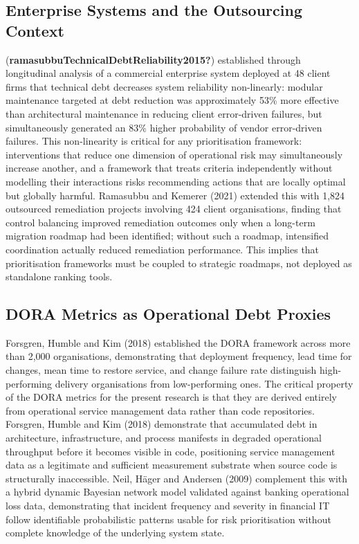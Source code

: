 \documentclass[
  british,
  12pt,
  a4paper,
]{report}
\begin{document}
\subsection{Enterprise Systems and the Outsourcing
Context}\label{enterprise-systems-and-the-outsourcing-context}

(\textbf{ramasubbuTechnicalDebtReliability2015?}) established through
longitudinal analysis of a commercial enterprise system deployed at 48
client firms that technical debt decreases system reliability
non-linearly: modular maintenance targeted at debt reduction was
approximately 53\% more effective than architectural maintenance in
reducing client error-driven failures, but simultaneously generated an
83\% higher probability of vendor error-driven failures. This
non-linearity is critical for any prioritisation framework:
interventions that reduce one dimension of operational risk may
simultaneously increase another, and a framework that treats criteria
independently without modelling their interactions risks recommending
actions that are locally optimal but globally harmful. Ramasubbu and
Kemerer (2021) extended this with 1,824 outsourced remediation projects
involving 424 client organisations, finding that control balancing
improved remediation outcomes only when a long-term migration roadmap
had been identified; without such a roadmap, intensified coordination
actually reduced remediation performance. This implies that
prioritisation frameworks must be coupled to strategic roadmaps, not
deployed as standalone ranking tools.

\subsection{DORA Metrics as Operational Debt
Proxies}\label{dora-metrics-as-operational-debt-proxies}

Forsgren, Humble and Kim (2018) established the DORA framework across
more than 2,000 organisations, demonstrating that deployment frequency,
lead time for changes, mean time to restore service, and change failure
rate distinguish high-performing delivery organisations from
low-performing ones. The critical property of the DORA metrics for the
present research is that they are derived entirely from operational
service management data rather than code repositories. Forsgren, Humble
and Kim (2018) demonstrate that accumulated debt in architecture,
infrastructure, and process manifests in degraded operational throughput
before it becomes visible in code, positioning service management data
as a legitimate and sufficient measurement substrate when source code is
structurally inaccessible. Neil, Häger and Andersen (2009) complement
this with a hybrid dynamic Bayesian network model validated against
banking operational loss data, demonstrating that incident frequency and
severity in financial IT follow identifiable probabilistic patterns
usable for risk prioritisation without complete knowledge of the
underlying system state.
\end{document}
